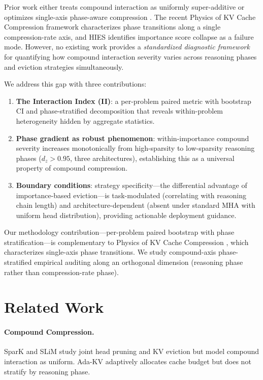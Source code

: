 \documentclass[11pt,a4paper]{article}
\begin{document}
Prior work either treats compound interaction as uniformly super-additive \cite{spark2024} or optimizes single-axis phase-aware compression \cite{thinkv2025}. The recent Physics of KV Cache Compression framework \cite{physicskv2026} characterizes phase transitions along a single compression-rate axis, and HIES \cite{hies2025} identifies importance score collapse as a failure mode. However, no existing work provides a \emph{standardized diagnostic framework} for quantifying how compound interaction severity varies across reasoning phases and eviction strategies simultaneously.

We address this gap with three contributions:

\begin{enumerate}
\item \textbf{The Interaction Index (II)}: a per-problem paired metric with bootstrap CI and phase-stratified decomposition that reveals within-problem heterogeneity hidden by aggregate statistics.
\item \textbf{Phase gradient as robust phenomenon}: within-importance compound severity increases monotonically from high-sparsity to low-sparsity reasoning phases ($d_z > 0.95$, three architectures), establishing this as a universal property of compound compression.
\item \textbf{Boundary conditions}: strategy specificity---the differential advantage of importance-based eviction---is task-modulated (correlating with reasoning chain length) and architecture-dependent (absent under standard MHA with uniform head distribution), providing actionable deployment guidance.
\end{enumerate}

Our methodology contribution---per-problem paired bootstrap with phase stratification---is complementary to Physics of KV Cache Compression \cite{physicskv2026}, which characterizes single-axis phase transitions. We study compound-axis phase-stratified empirical auditing along an orthogonal dimension (reasoning phase rather than compression-rate phase).

\section{Related Work}

\paragraph{Compound Compression.}
SparK \cite{spark2024} and SLiM \cite{slim2024} study joint head pruning and KV eviction but model compound interaction as uniform. Ada-KV \cite{adakv2024} adaptively allocates cache budget but does not stratify by reasoning phase.
\end{document}

